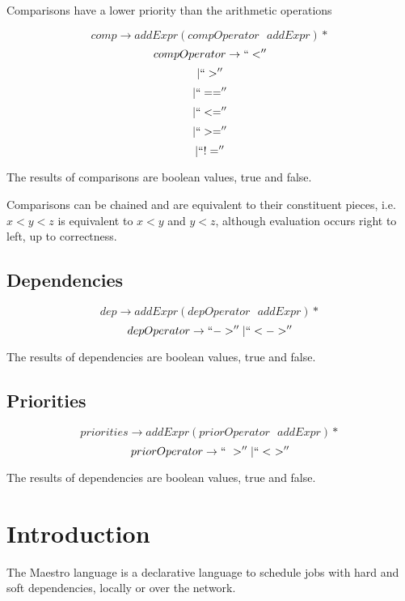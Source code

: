 \documentclass[12pt]{article}
\begin{document}
Comparisons have a lower priority than the arithmetic operations

$$comp \rightarrow addExpr (compOperator \text{ } addExpr)*$$
$$compOperator \rightarrow ``<'' $$
$$\vert ``>'' $$
$$\vert ``=='' $$
$$\vert ``<='' $$
$$\vert ``>='' $$
$$\vert ``!=''$$

The results of comparisons are boolean values, true and false.

Comparisons can be chained and are equivalent to their constituent pieces, i.e. $x < y < z$ is equivalent to $x < y$ and $y < z$, although evaluation occurs right to left, up to correctness.

\subsection{Dependencies}

$$dep \rightarrow addExpr (depOperator \text{ } addExpr)*$$
$$depOperator \rightarrow ``->'' \vert ``<->''$$

The results of dependencies are boolean values, true and false. 

\subsection{Priorities}

$$priorities \rightarrow addExpr (priorOperator \text{ } addExpr)*$$
$$priorOperator \rightarrow ``~>'' \vert ``<~>''$$

The results of dependencies are boolean values, true and false.










\section{Introduction}
The Maestro language is a declarative language to schedule jobs with hard and soft dependencies, locally or over the network.
\end{document}
